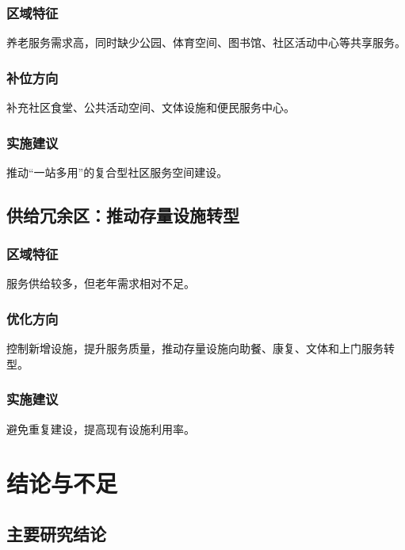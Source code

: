 \documentclass[UTF8,zihao=-4,a4paper,fontset=none]{ctexart}
\begin{document}
\subsubsection{区域特征}

养老服务需求高，同时缺少公园、体育空间、图书馆、社区活动中心等共享服务。

\subsubsection{补位方向}

补充社区食堂、公共活动空间、文体设施和便民服务中心。

\subsubsection{实施建议}

推动“一站多用”的复合型社区服务空间建设。

\subsection{供给冗余区：推动存量设施转型}

\subsubsection{区域特征}

服务供给较多，但老年需求相对不足。

\subsubsection{优化方向}

控制新增设施，提升服务质量，推动存量设施向助餐、康复、文体和上门服务转型。

\subsubsection{实施建议}

避免重复建设，提高现有设施利用率。

\section{结论与不足}

\subsection{主要研究结论}
\end{document}
